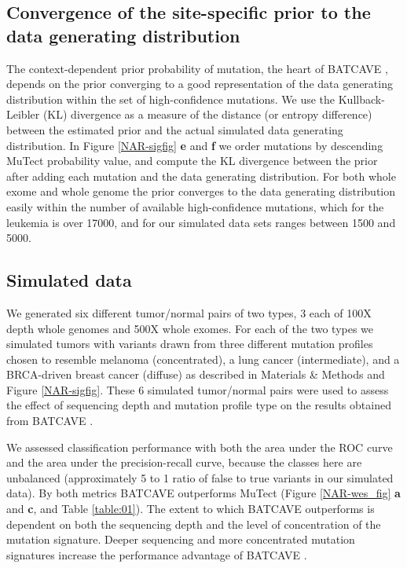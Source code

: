 \documentclass[a4,center,fleqn]{NAR}
\newcommand{\batcave}{BATCAVE }
\begin{document}
\subsection{Convergence of the site-specific prior to the data generating distribution}
The context-dependent prior probability of mutation, the heart of \batcave, depends on the prior converging to a good representation of the data generating distribution within the set of high-confidence mutations.
We use the Kullback-Leibler (KL) divergence as a measure of the distance (or entropy difference) between the estimated prior and the actual simulated data generating distribution.
In Figure \ref{NAR-sigfig} \textbf{e} and \textbf{f} we order mutations by descending MuTect probability value, and compute the KL divergence between the prior after adding each mutation and the data generating distribution.
For both whole exome and whole genome the prior converges to the data generating distribution easily within the number of available high-confidence mutations, which for the \citet{Griffith2015} leukemia is over 17000, and for our simulated data sets ranges between 1500 and 5000.




\subsection{Simulated data}
We generated six different tumor/normal pairs of two types, 3 each of 100X depth whole genomes and 500X whole exomes.
For each of the two types we simulated tumors with variants drawn from three different mutation profiles chosen to resemble melanoma (concentrated), a lung cancer (intermediate), and a BRCA-driven breast cancer (diffuse)  as described in Materials \& Methods and Figure \ref{NAR-sigfig}.
These 6 simulated tumor/normal pairs were used to assess the effect of sequencing depth and mutation profile type on the results obtained from \batcave.



We assessed classification performance with both the area under the ROC curve and the area under the precision-recall curve, because the classes here are unbalanced (approximately 5 to 1 ratio of false to true variants in our simulated data).
By both metrics \batcave outperforms MuTect (Figure \ref{NAR-wes_fig} \textbf{a} and \textbf{c}, and Table \ref{table:01}).
The extent to which \batcave outperforms is dependent on both the sequencing depth and the level of concentration of the mutation signature.
Deeper sequencing and more concentrated mutation signatures increase the performance advantage of \batcave. 
\end{document}
